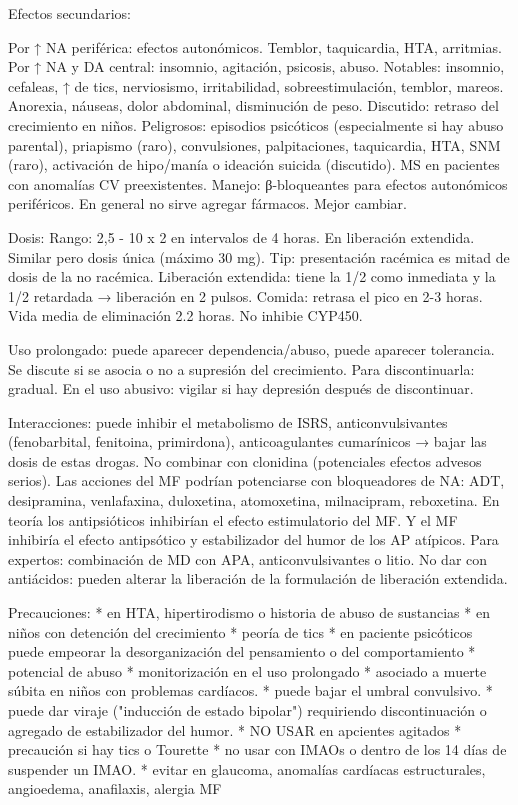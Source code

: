 Efectos secundarios:

Por ↑ NA periférica: efectos autonómicos. Temblor, taquicardia, HTA, arritmias.
Por ↑ NA y DA central: insomnio, agitación, psicosis, abuso.
Notables: insomnio, cefaleas, ↑ de tics, nerviosismo, irritabilidad, sobreestimulación, temblor, mareos. Anorexia, náuseas, dolor abdominal, disminución de peso. Discutido: retraso del crecimiento en niños.
Peligrosos: episodios psicóticos (especialmente si hay abuso parental), priapismo (raro), convulsiones, palpitaciones, taquicardia, HTA, SNM (raro), activación de hipo/manía o ideación suicida (discutido). MS en pacientes con anomalías CV preexistentes.
Manejo: β-bloqueantes para efectos autonómicos periféricos. En general no sirve agregar fármacos. Mejor cambiar.

Dosis:
Rango: 2,5 - 10 x 2 en intervalos de 4 horas. En liberación extendida. Similar pero dosis única (máximo 30 mg).
Tip: presentación racémica es mitad de dosis de la no racémica. Liberación extendida: tiene la 1/2 como inmediata y la 1/2 retardada → liberación en 2 pulsos. Comida: retrasa el pico en 2-3 horas. Vida media de eliminación 2.2 horas. No inhibie CYP450.

Uso prolongado: puede aparecer dependencia/abuso, puede aparecer tolerancia. Se discute si se asocia o no a supresión del crecimiento. Para discontinuarla: gradual. En el uso abusivo: vigilar si hay depresión después de discontinuar.

Interacciones: puede inhibir el metabolismo de ISRS, anticonvulsivantes (fenobarbital, fenitoina, primirdona), anticoagulantes cumarínicos → bajar las dosis de estas drogas. No combinar con clonidina (potenciales efectos advesos serios). Las acciones del MF podrían potenciarse con bloqueadores de NA: ADT, desipramina, venlafaxina, duloxetina, atomoxetina, milnacipram, reboxetina. En teoría los antipsióticos inhibirían el efecto estimulatorio del MF. Y el MF inhibiría el efecto antipsótico y estabilizador del humor de los AP atípicos.
Para expertos: combinación de MD con APA, anticonvulsivantes o litio.
No dar con antiácidos: pueden alterar la liberación de la formulación de liberación extendida.

Precauciones:
* en HTA, hipertirodismo o historia de abuso de sustancias
* en niños con detención del crecimiento
* peoría de tics
* en paciente psicóticos puede empeorar la desorganización del pensamiento o del comportamiento
* potencial de abuso
* monitorización en el uso prolongado
* asociado a muerte súbita en niños con problemas cardíacos.
* puede bajar el umbral convulsivo.
* puede dar viraje ("inducción de estado bipolar") requiriendo discontinuación o agregado de estabilizador del humor.
* NO USAR en apcientes agitados
* precaución si hay tics o Tourette
* no usar con IMAOs o dentro de los 14 días de suspender un IMAO.
* evitar en glaucoma, anomalías cardíacas estructurales, angioedema, anafilaxis, alergia MF

